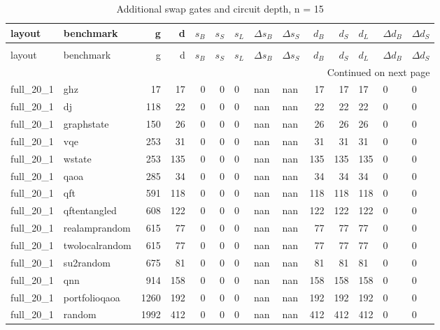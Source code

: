 \begin{longtable}{llrrrrlllrrlll}
\caption{Additional swap gates and circuit depth, n = 15} \label{benchmark-table-15} \\
\toprule
layout & benchmark & g & d & $s_B$ & $s_S$ & $s_L$ & $\Delta s_B$ & $\Delta s_S$ & $d_B$ & $d_S$ & $d_L$ & $\Delta d_B$ & $\Delta d_S$ \\
\midrule
\endfirsthead
\caption[]{Additional swap gates and circuit depth, n = 15} \\
\toprule
layout & benchmark & g & d & $s_B$ & $s_S$ & $s_L$ & $\Delta s_B$ & $\Delta s_S$ & $d_B$ & $d_S$ & $d_L$ & $\Delta d_B$ & $\Delta d_S$ \\
\midrule
\endhead
\midrule
\multicolumn{14}{r}{Continued on next page} \\
\midrule
\endfoot
\bottomrule
\endlastfoot
full\_20\_1 & ghz & 17 & 17 & 0 & 0 & 0 & nan & nan & 17 & 17 & 17 & 0 & 0 \\
full\_20\_1 & dj & 118 & 22 & 0 & 0 & 0 & nan & nan & 22 & 22 & 22 & 0 & 0 \\
full\_20\_1 & graphstate & 150 & 26 & 0 & 0 & 0 & nan & nan & 26 & 26 & 26 & 0 & 0 \\
full\_20\_1 & vqe & 253 & 31 & 0 & 0 & 0 & nan & nan & 31 & 31 & 31 & 0 & 0 \\
full\_20\_1 & wstate & 253 & 135 & 0 & 0 & 0 & nan & nan & 135 & 135 & 135 & 0 & 0 \\
full\_20\_1 & qaoa & 285 & 34 & 0 & 0 & 0 & nan & nan & 34 & 34 & 34 & 0 & 0 \\
full\_20\_1 & qft & 591 & 118 & 0 & 0 & 0 & nan & nan & 118 & 118 & 118 & 0 & 0 \\
full\_20\_1 & qftentangled & 608 & 122 & 0 & 0 & 0 & nan & nan & 122 & 122 & 122 & 0 & 0 \\
full\_20\_1 & realamprandom & 615 & 77 & 0 & 0 & 0 & nan & nan & 77 & 77 & 77 & 0 & 0 \\
full\_20\_1 & twolocalrandom & 615 & 77 & 0 & 0 & 0 & nan & nan & 77 & 77 & 77 & 0 & 0 \\
full\_20\_1 & su2random & 675 & 81 & 0 & 0 & 0 & nan & nan & 81 & 81 & 81 & 0 & 0 \\
full\_20\_1 & qnn & 914 & 158 & 0 & 0 & 0 & nan & nan & 158 & 158 & 158 & 0 & 0 \\
full\_20\_1 & portfolioqaoa & 1260 & 192 & 0 & 0 & 0 & nan & nan & 192 & 192 & 192 & 0 & 0 \\
full\_20\_1 & random & 1992 & 412 & 0 & 0 & 0 & nan & nan & 412 & 412 & 412 & 0 & 0 \\

\end{longtable}
